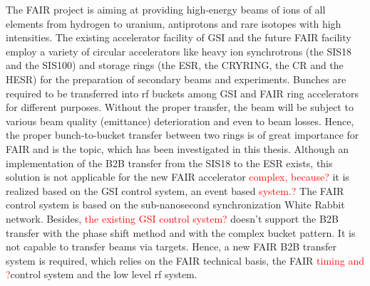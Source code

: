 The FAIR project is aiming at providing high-energy beams of ions of all elements from hydrogen to uranium, antiprotons and rare isotopes with high intensities. The existing accelerator facility of GSI and the future FAIR facility employ a variety of circular accelerators like heavy ion synchrotrons (the SIS18 and the SIS100) and storage rings (the ESR, the CRYRING, the CR and the HESR) for the preparation of secondary beams and experiments. Bunches are required to be transferred into rf buckets among GSI and FAIR ring accelerators for different purposes. Without the proper transfer, the beam will be subject to various beam quality (emittance) deterioration and even to beam losses. Hence, the proper bunch-to-bucket transfer between two rings is of great importance for FAIR and is the topic, which has been investigated in this thesis. Although an implementation of the B2B transfer from the SIS18 to the ESR exists, this solution is not applicable for the new FAIR accelerator \textcolor{red}{complex, because?} it is realized based on the GSI control system, an event based \textcolor{red}{system.?} The FAIR control system is based on the sub-nanosecond synchronization White Rabbit network. Besides, \textcolor{red}{the existing GSI control system?} doesn't support the B2B transfer with the phase shift method and with the complex bucket pattern. It is not capable to transfer beams via targets. Hence, a new FAIR B2B transfer system is required, which relies on the FAIR technical basis, the FAIR \textcolor{red}{timing and ?}control system and the low level rf system.



